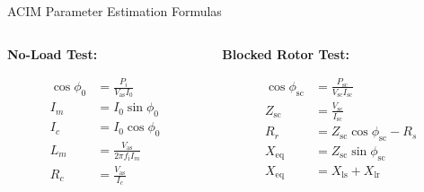 \begin{frame}{ACIM Parameter Estimation Formulas}
	\begin{columns}[T] %

		\begin{column}{0.48\textwidth} %

			\textbf{No-Load Test:}

			\begin{align*}
				\cos \phi_0 & = \frac{P_i}{V_\text{as}I_0}             \\
				I_m         & = I_0 \sin \phi_0                        \\
				I_c         & = I_0 \cos \phi_0                        \\
				L_m         & = \frac{V_\text{as}}{2\pi f_\text{i}I_m} \\
				R_c         & = \frac{V_\text{as}}{I_c}
			\end{align*}

		\end{column}

		\begin{column}{0.48\textwidth}

			\textbf{Blocked Rotor Test:}

			\begin{align*}
				\cos \phi_\text{sc} & = \frac{P_\text{sc}}{V_\text{sc}I_\text{sc}} \\
				Z_\text{sc}         & = \frac{V_\text{sc}}{I_\text{sc}}            \\
				R_r                 & = Z_\text{sc} \cos \phi_\text{sc} - R_s      \\
				X_\text{eq}         & = Z_\text{sc} \sin \phi_\text{sc}            \\
				X_\text{eq}         & = X_\text{ls} + X_\text{lr}
			\end{align*}

		\end{column}

	\end{columns}
\end{frame}



